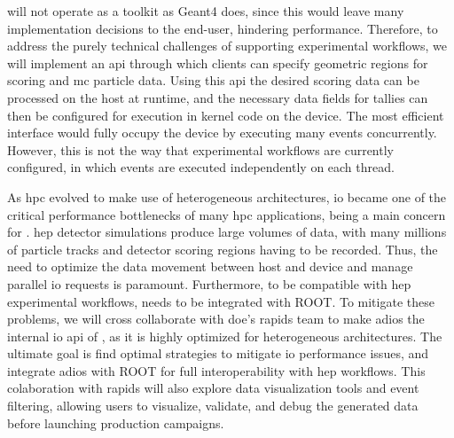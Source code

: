 \celeritas will not operate as a toolkit as Geant4 does, since this would leave
many implementation decisions to the end-user, hindering performance. Therefore,
to address the purely technical challenges of supporting experimental workflows,
we will implement an \ac{api} through which clients can specify geometric
regions for scoring and \ac{mc} particle data. Using this \ac{api} the desired
scoring data can be processed on the host at runtime, and the necessary data
fields for tallies can then be configured for execution in kernel code on the
device.  The most efficient interface would fully occupy the device by executing
many events concurrently.  However, this is not the way that experimental
workflows are currently configured, in which events are executed independently
on each thread.

As \ac{hpc} evolved to make use of heterogeneous architectures, \ac{io} became
one of the critical performance bottlenecks of many \ac{hpc} applications, being
a main concern for \celeritas. \ac{hep} detector simulations produce large
volumes of data, with many millions of particle tracks and detector scoring
regions having to be recorded. Thus, the need to optimize the data movement
between host and device and manage parallel \ac{io} requests is paramount.
Furthermore, to be compatible with \ac{hep} experimental workflows, \celeritas
needs to be integrated with ROOT. To mitigate these problems, we will cross
collaborate with \ac{doe}'s \ac{rapids} team to make \ac{adios} the internal
\ac{io} \ac{api} of \celeritas, as it is highly optimized for heterogeneous
architectures. The ultimate goal is find optimal strategies to mitigate \ac{io}
performance issues, and integrate \ac{adios} with ROOT for full interoperability
with \ac{hep} workflows. This colaboration with \ac{rapids} will also explore
data visualization tools and event filtering, allowing users to visualize,
validate, and debug the generated data before launching production campaigns.

